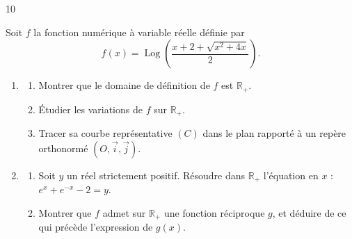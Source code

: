\documentclass{axiobac}
\begin{document}
\begin{probleme}{10}

Soit $f$ la fonction numérique à variable réelle définie par
\[
f(x) = \operatorname{Log}\left( \frac{x + 2 + \sqrt{x^2 + 4x}}{2} \right) .
\]


\begin{enumerate}
    \item
    \begin{enumerate}
        \item Montrer que le domaine de définition de $f$ est $\mathbb{R}_+$.
        \item Étudier les variations de $f$ sur $\mathbb{R}_+$.
        \item Tracer sa courbe représentative $(C)$ dans le plan rapporté à un repère orthonormé $(O, \vec{i}, \vec{j})$.
    \end{enumerate}
    \item
    \begin{enumerate}
        \item Soit $y$ un réel strictement positif. Résoudre dans $\mathbb{R}_+$ l'équation en $x$ : $e^x + e^{-x} - 2 = y$.
        \item Montrer que $f$ admet sur $\mathbb{R}_+$ une fonction réciproque $g$, et déduire de ce qui précède l'expression de $g(x)$.
    \end{enumerate}
\end{enumerate}



\end{probleme}
\end{document}
